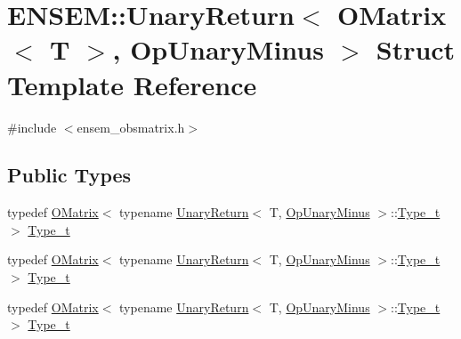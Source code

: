 \hypertarget{structENSEM_1_1UnaryReturn_3_01OMatrix_3_01T_01_4_00_01OpUnaryMinus_01_4}{}\section{E\+N\+S\+EM\+:\+:Unary\+Return$<$ O\+Matrix$<$ T $>$, Op\+Unary\+Minus $>$ Struct Template Reference}
\label{structENSEM_1_1UnaryReturn_3_01OMatrix_3_01T_01_4_00_01OpUnaryMinus_01_4}


{\ttfamily \#include $<$ensem\+\_\+obsmatrix.\+h$>$}

\subsection*{Public Types}
\begin{DoxyCompactItemize}
\item 
typedef \mbox{\hyperlink{classENSEM_1_1OMatrix}{O\+Matrix}}$<$ typename \mbox{\hyperlink{structENSEM_1_1UnaryReturn}{Unary\+Return}}$<$ T, \mbox{\hyperlink{structENSEM_1_1OpUnaryMinus}{Op\+Unary\+Minus}} $>$\+::\mbox{\hyperlink{structENSEM_1_1UnaryReturn_3_01OMatrix_3_01T_01_4_00_01OpUnaryMinus_01_4_a7ee85b64d167dda62c67b1c0e963de96}{Type\+\_\+t}} $>$ \mbox{\hyperlink{structENSEM_1_1UnaryReturn_3_01OMatrix_3_01T_01_4_00_01OpUnaryMinus_01_4_a7ee85b64d167dda62c67b1c0e963de96}{Type\+\_\+t}}
\item 
typedef \mbox{\hyperlink{classENSEM_1_1OMatrix}{O\+Matrix}}$<$ typename \mbox{\hyperlink{structENSEM_1_1UnaryReturn}{Unary\+Return}}$<$ T, \mbox{\hyperlink{structENSEM_1_1OpUnaryMinus}{Op\+Unary\+Minus}} $>$\+::\mbox{\hyperlink{structENSEM_1_1UnaryReturn_3_01OMatrix_3_01T_01_4_00_01OpUnaryMinus_01_4_a7ee85b64d167dda62c67b1c0e963de96}{Type\+\_\+t}} $>$ \mbox{\hyperlink{structENSEM_1_1UnaryReturn_3_01OMatrix_3_01T_01_4_00_01OpUnaryMinus_01_4_a7ee85b64d167dda62c67b1c0e963de96}{Type\+\_\+t}}
\item 
typedef \mbox{\hyperlink{classENSEM_1_1OMatrix}{O\+Matrix}}$<$ typename \mbox{\hyperlink{structENSEM_1_1UnaryReturn}{Unary\+Return}}$<$ T, \mbox{\hyperlink{structENSEM_1_1OpUnaryMinus}{Op\+Unary\+Minus}} $>$\+::\mbox{\hyperlink{structENSEM_1_1UnaryReturn_3_01OMatrix_3_01T_01_4_00_01OpUnaryMinus_01_4_a7ee85b64d167dda62c67b1c0e963de96}{Type\+\_\+t}} $>$ \mbox{\hyperlink{structENSEM_1_1UnaryReturn_3_01OMatrix_3_01T_01_4_00_01OpUnaryMinus_01_4_a7ee85b64d167dda62c67b1c0e963de96}{Type\+\_\+t}}
\end{DoxyCompactItemize}



